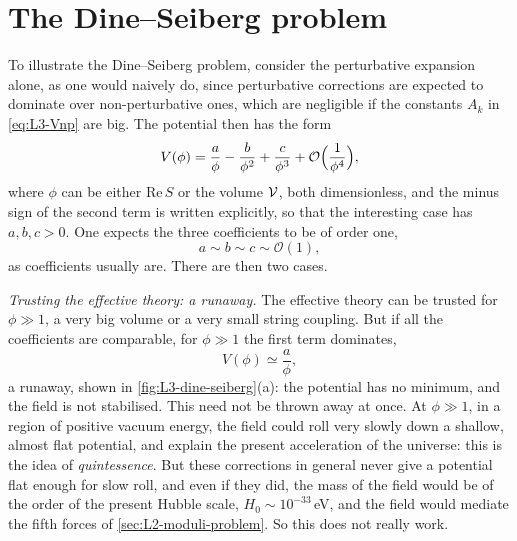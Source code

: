 \section{The Dine--Seiberg problem}
\label{sec:L3-dine-seiberg}

To illustrate the Dine--Seiberg problem, consider the perturbative expansion alone, as one would naively do, since perturbative corrections are expected to dominate over non-perturbative ones, which are negligible if the constants $A_k$ in \cref{eq:L3-Vnp} are big. The potential then has the form
\begin{equation}
  V(\phi) = \frac{a}{\phi} - \frac{b}{\phi^2} + \frac{c}{\phi^3} + \mathcal O\Bigl(\frac{1}{\phi^4}\Bigr) ,
  \label{eq:L3-toy}
\end{equation}
where $\phi$ can be either $\mathrm{Re}\,S$ or the volume $\mathcal{V}$, both dimensionless, and the minus sign of the second term is written explicitly, so that the interesting case has $a,b,c>0$. One expects the three coefficients to be of order one,
\begin{equation}
  a\sim b\sim c\sim\mathcal O(1) ,
  \label{eq:L3-natural}
\end{equation}
as coefficients usually are. There are then two cases.

\emph{Trusting the effective theory: a runaway.} The effective theory can be trusted for $\phi\gg1$, a very big volume or a very small string coupling. But if all the coefficients are comparable, for $\phi\gg1$ the first term dominates,
\begin{equation}
  V(\phi)\simeq\frac{a}{\phi} ,
  \label{eq:L3-runaway}
\end{equation}
a runaway, shown in \cref{fig:L3-dine-seiberg}(a): the potential has no minimum, and the field is not stabilised. This need not be thrown away at once. At $\phi\gg1$, in a region of positive vacuum energy, the field could roll very slowly down a shallow, almost flat potential, and explain the present acceleration of the universe: this is the idea of \emph{quintessence}. But these corrections in general never give a potential flat enough for slow roll, and even if they did, the mass of the field would be of the order of the present Hubble scale, $H_0\sim10^{-33}\,$eV, and the field would mediate the fifth forces of \cref{sec:L2-moduli-problem}. So this does not really work.

